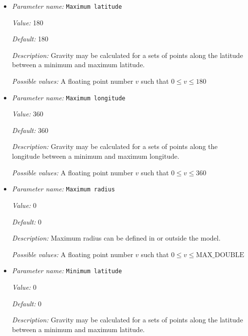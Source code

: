 \begin{itemize}
\item {\it Parameter name:} {\tt Maximum latitude}
\label{parameters:Postprocess/Gravity calculation/Maximum latitude}


{\it Value:} 180


{\it Default:} 180


{\it Description:} Gravity may be calculated for a sets of points along the latitude between a minimum and maximum latitude.


{\it Possible values:} A floating point number $v$ such that $0 \leq v \leq 180$
\item {\it Parameter name:} {\tt Maximum longitude}
\label{parameters:Postprocess/Gravity calculation/Maximum longitude}


{\it Value:} 360


{\it Default:} 360


{\it Description:} Gravity may be calculated for a sets of points along the longitude between a minimum and maximum longitude.


{\it Possible values:} A floating point number $v$ such that $0 \leq v \leq 360$
\item {\it Parameter name:} {\tt Maximum radius}
\label{parameters:Postprocess/Gravity calculation/Maximum radius}


{\it Value:} 0


{\it Default:} 0


{\it Description:} Maximum radius can be defined in or outside the model.


{\it Possible values:} A floating point number $v$ such that $0 \leq v \leq \text{MAX\_DOUBLE}$
\item {\it Parameter name:} {\tt Minimum latitude}
\label{parameters:Postprocess/Gravity calculation/Minimum latitude}


{\it Value:} 0


{\it Default:} 0


{\it Description:} Gravity may be calculated for a sets of points along the latitude between a minimum and maximum latitude.



\end{itemize}
